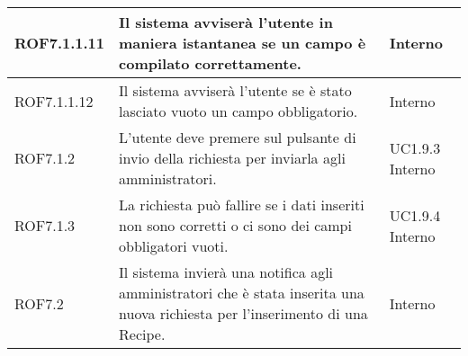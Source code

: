 \begin{center}
\begin{longtable}{| p{2.5cm} | p{8cm} | p{2cm} |}
		\hline
		ROF7.1.1.11 & Il sistema avviserà l'utente in maniera istantanea se un campo è compilato correttamente. & Interno \\
		\hline
		ROF7.1.1.12 & Il sistema avviserà l'utente se è stato lasciato vuoto un campo obbligatorio. & Interno \\
		\hline
		ROF7.1.2 & L'utente deve premere sul pulsante di invio della richiesta per inviarla agli amministratori. & UC1.9.3 \newline Interno \\
		\hline
		ROF7.1.3 & La richiesta può fallire se i dati inseriti non sono corretti o ci sono dei campi obbligatori vuoti. & UC1.9.4 \newline Interno \\
		\hline
		ROF7.2  & Il sistema invierà una notifica agli amministratori che è stata inserita una nuova richiesta per l'inserimento di una Recipe. & Interno \\
		\hline





\end{longtable}
\end{center}

